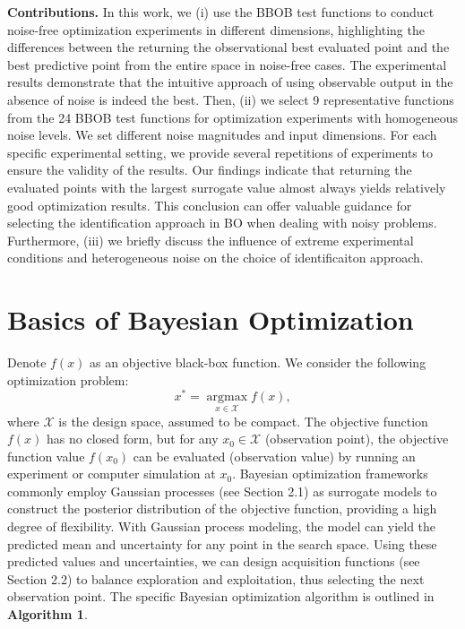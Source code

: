 \documentclass{article}
\begin{document}
\hspace{2em}
\textbf{Contributions.} In this work, we (i) use the BBOB test functions to conduct noise-free optimization experiments in different dimensions, highlighting the differences between the returning the observational best evaluated point and the best predictive point from the entire space in noise-free cases. The experimental results demonstrate that the intuitive approach of using observable output in the absence of noise is indeed the best. Then, (ii) we select 9 representative functions from the 24 BBOB test functions for optimization experiments with homogeneous noise levels. We set different noise magnitudes and input dimensions. For each specific experimental setting, we provide several repetitions of experiments to ensure the validity of the results. Our findings indicate that returning the evaluated points with the largest surrogate value almost always yields relatively good optimization results. This conclusion can offer valuable guidance for selecting the identification approach in BO when dealing with noisy problems. Furthermore, (iii) we briefly discuss the influence of extreme experimental conditions and heterogeneous noise on the choice of identificaiton approach.


\section{Basics of Bayesian Optimization}
\hspace{2em}Denote $f(x)$ as an objective black-box function. We consider the following optimization problem:
\begin{equation}\label{eq1}
	x^* = \mathop{\arg\max}\limits_{x \in \mathcal{X}} f(x),
\end{equation}
where $\mathcal{X}$ is the design space, assumed to be compact. The objective function $f(x)$ has no closed form, but for any $x_0 \in \mathcal{X}$ (observation point), the objective function value $f(x_0)$ can be evaluated (observation value) by running an experiment or computer simulation at $x_0$. Bayesian optimization frameworks commonly employ Gaussian processes (see Section 2.1) as surrogate models to construct the posterior distribution of the objective function, providing a high degree of flexibility. With Gaussian process modeling, the model can yield the predicted mean and uncertainty for any point in the search space. Using these predicted values and uncertainties, we can design acquisition functions (see Section 2.2) to balance exploration and exploitation, thus selecting the next observation point. The specific Bayesian optimization algorithm is outlined in \textbf{Algorithm 1}.
\end{document}
